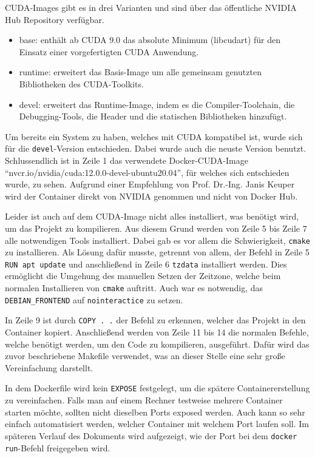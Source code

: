CUDA-Images gibt es in drei Varianten und sind über das öffentliche NVIDIA Hub Repository verfügbar.

\begin{itemize}
    \item base: enthält ab CUDA 9.0 das absolute Minimum (libcudart) für den Einsatz einer vorgefertigten CUDA Anwendung.
    \item runtime: erweitert das Basis-Image um alle gemeinsam genutzten Bibliotheken des CUDA-Toolkits.
    \item devel: erweitert das Runtime-Image, indem es die Compiler-Toolchain, die Debugging-Tools, die Header und die statischen Bibliotheken hinzufügt.
\end{itemize}

Um bereits ein System zu haben, welches mit CUDA kompatibel ist, wurde sich für die \verb|devel|-Version entschieden.
Dabei wurde auch die neuste Version benutzt. Schlussendlich ist in Zeile 1 das verwendete Docker-CUDA-Image
``nvcr.io/nvidia/cuda:12.0.0-devel-ubuntu20.04'', für welches sich entschieden wurde, zu sehen. Aufgrund einer
Empfehlung von Prof. Dr.-Ing. Janis Keuper wird der Container direkt von NVIDIA genommen und nicht von Docker Hub.

Leider ist auch auf dem CUDA-Image nicht alles installiert, was benötigt wird, um das Projekt zu kompilieren. Aus diesem
Grund werden von Zeile 5 bis Zeile 7 alle notwendigen Tools installiert. Dabei gab es vor allem die Schwierigkeit,
\verb|cmake| zu installieren. Als Lösung dafür musste, getrennt von allem, der Befehl in Zeile 5
\verb|RUN apt update| und anschließend in Zeile 6 \verb|tzdata| installiert werden. Dies ermöglicht die Umgehung des
manuellen Setzen der Zeitzone, welche beim normalen Installieren von \verb|cmake| auftritt. Auch war es notwendig, das
\verb|DEBIAN_FRONTEND| auf \verb|nointeractice| zu setzen.

In Zeile 9 ist durch \verb|COPY . .| der Befehl zu erkennen, welcher das Projekt in den Container kopiert. Anschließend
werden von Zeile 11 bis 14 die normalen Befehle, welche benötigt werden, um den Code zu kompilieren, ausgeführt. Dafür
wird das zuvor beschriebene Makefile verwendet, was an dieser Stelle eine sehr große Vereinfachung darstellt.

In dem Dockerfile wird kein \verb|EXPOSE| festgelegt, um die spätere Containererstellung zu vereinfachen. Falls man auf
einem Rechner testweise mehrere Container starten möchte, sollten nicht dieselben Ports exposed werden. Auch kann so
sehr einfach automatisiert werden, welcher Container mit welchem Port laufen soll. Im späteren Verlauf des Dokuments
wird aufgezeigt, wie der Port bei dem \verb|docker run|-Befehl freigegeben wird.


